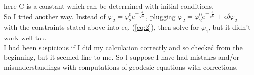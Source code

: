 \documentclass[fleqn]{article}
\begin{document}
here C is a constant which can be determined with initial conditions. \\
\indent So I tried another way. Instead of $\varphi_{2} = \varphi_{2} ^{0} e^{\pm \frac{s}{\sqrt{k}}}$, plugging $\varphi_{2} = \varphi_{2} ^{0} e^{\pm \frac{s}{\sqrt{k}}} + \epsilon\delta \varphi_{2}$ with the constraints stated above into eq. (\ref{eq:2}),
then solve for $\varphi_{1}$, but it didn't work well too. \\
\indent I had been suspicious if I did my calculation correctly and so checked from the beginning, but it seemed fine to me. So I suppose I have had mistakes and/or misunderstandings with computations of geodesic equations with corrections. 
\end{document}
